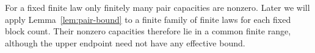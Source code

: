 For a fixed finite law only finitely many pair capacities are
nonzero.  Later we will apply Lemma~\ref{lem:pair-bound} to a finite
family of finite laws for each fixed block count.  Their nonzero
capacities therefore lie in a common finite range, although the
upper endpoint need not have any effective bound.
